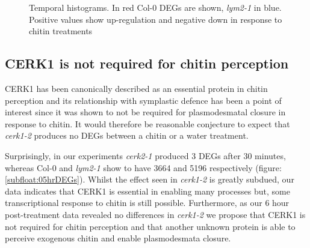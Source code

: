 \documentclass[../main.tex]{subfiles}
\begin{document}
\begin{figure}[!ht]
  \centering
  \caption[Temporal histograms of RNAseq data]{Temporal histograms. In red Col-0 DEGs are shown, \textit{lym2-1} in
    blue. Positive values show up-regulation and negative down in response to
    chitin treatments}
  \label{fig:tmpHist}
\end{figure}


\subsection{CERK1 is not required for chitin perception}

CERK1 has been canonically described as an essential protein in chitin
perception \cite{miyaCERK1LysMReceptor2007,
  shinyaFunctionalCharacterizationCEBiP2012} and its relationship with
symplastic defence has been a point of interest since it was shown to not be
required for plasmodesmatal closure in response to chitin. It would therefore be
reasonable conjecture to expect that \textit{cerk1-2} produces no DEGs between a
chitin or a water treatment. 

Surprisingly, in our experiments \textit{cerk2-1} produced 3 DEGs after 30
minutes, whereas Col-0 and \textit{lym2-1} show to have 3664 and 5196
respectively (figure: \ref{subfloat:05hrDEGs}). Whilst the effect seen in
\textit{cerk1-2} is greatly subdued, our data indicates that CERK1 is essential
in enabling many processes but, some transcriptional response to chitin is still
possible. Furthermore, as our 6 hour post-treatment data revealed no differences
in \textit{cerk1-2} we propose that CERK1 is not required for chitin perception
and that another unknown protein is able to perceive exogenous chitin and enable
plasmodesmata closure. 
\end{document}

